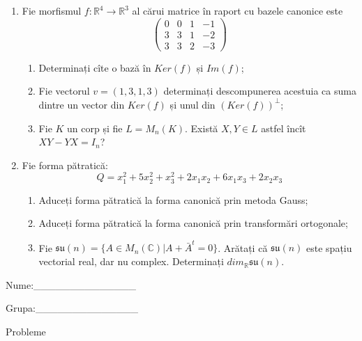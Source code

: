 \documentclass{article}
\begin{document}
\begin{enumerate}
 \item Fie morfismul $f:\mathbb{R}^4 \to \mathbb{R}^3$ al cărui matrice în raport cu bazele canonice este
$$\begin{pmatrix}
0&0&1&-1\\
3&3&1&-2\\
3&3&2&-3
\end{pmatrix}$$

\begin{enumerate}
\item Determinați cîte o bază în $Ker(f)$ și $Im(f)$;
\item Fie vectorul $v=(1,3,1,3)$ determinați descompunerea acestuia ca suma dintre un vector din $Ker(f)$ și unul din $(Ker(f))^\perp$;
\item Fie $K$ un corp și fie $L=M_n(K)$. Există $X,Y \in L$ astfel încît $XY-YX=I_n$?  
\end{enumerate}
\item Fie forma pătratică:
$$Q= x_1^2+5x_2^2+x_3^2+2x_1x_2+6x_1x_3+2x_2x_3$$

\begin{enumerate}
\item Aduceți forma pătratică la forma canonică prin metoda Gauss;
\item Aduceți forma pătratică la forma canonică prin transformări ortogonale;
\item Fie $\mathfrak{su}(n)=\{ A \in M_n(\mathbb{C}) | A+\bar{A}^t=0\}$. Arătați că $\mathfrak{su}(n)$ este spațiu vectorial real, dar nu complex.
Determinați $dim_{\mathbb{R}}\mathfrak{su}(n)$.
\end{enumerate}
\end{enumerate}
\newpage
\begin{flushright}
Nume:\_\_\_\_\_\_\_\_\_\_\_\_\_\_
 
 
Grupa:\_\_\_\_\_\_\_\_\_\_\_\_\_\_
\end{flushright}
\begin{center}
\vspace{2cm}
{\Large Probleme}
\vspace{2cm}
\end{center}
\end{document}
